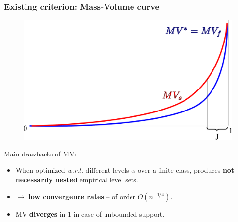 \documentclass[9pt]{beamer}
\begin{document}



\begin{frame}
\frametitle{Existing criterion: Mass-Volume curve}
\begin{figure}
\includegraphics[width = 0.7\linewidth]{sourcefigs/mv.pdf}
\end{figure}

Main drawbacks of MV:
\begin{itemize}
\item When optimized \emph{w.r.t.} different levels $\alpha$ over a finite class, produces \textbf{not necessarily nested} empirical level sets.
\item $\to$ \textbf{low convergence rates} -- of order $O(n^{-1/4})$.
\item MV \textbf{diverges} in $1$ in case of unbounded support.
\end{itemize}

\end{frame}
\end{document}
